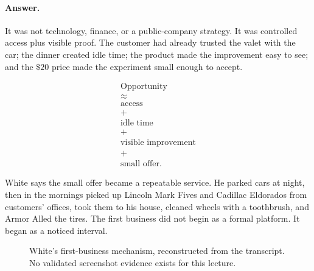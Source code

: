 \documentclass[11pt,oneside]{book}
\begin{document}
\paragraph{Answer.}
It was not technology, finance, or a public-company strategy. It was controlled access plus visible proof. The customer had already trusted the valet with the car; the dinner created idle time; the product made the improvement easy to see; and the \(\$20\) price made the experiment small enough to accept.

\begin{equation}
\begin{gathered}
\text{Opportunity}\\
\approx\\
\text{access}\\
+\\
\text{idle time}\\
+\\
\text{visible improvement}\\
+\\
\text{small offer}.
\end{gathered}
\end{equation}

White says the small offer became a repeatable service. He parked cars at night, then in the mornings picked up Lincoln Mark Fives and Cadillac Eldorados from customers' offices, took them to his house, cleaned wheels with a toothbrush, and Armor Alled the tires. The first business did not begin as a formal platform. It began as a noticed interval.

\begin{figure}
\centering
{}
\caption{White's first-business mechanism, reconstructed from the transcript. No validated screenshot evidence exists for this lecture.}
\end{figure}
\end{document}
